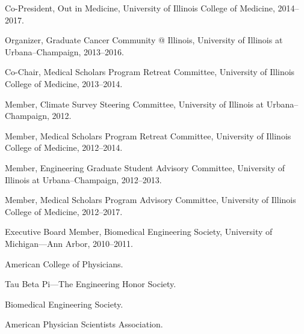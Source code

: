 \documentclass[11pt,article,oneside]{memoir}
\begin{document}
\ind Co-President, Out in Medicine, University of Illinois College of Medicine, 2014--2017.

\ind Organizer, Graduate Cancer Community @ Illinois, University of Illinois at Urbana--Champaign, 2013--2016.

\ind Co-Chair, Medical Scholars Program Retreat Committee, University of Illinois College of Medicine, 2013--2014.

\ind Member, Climate Survey Steering Committee, University of Illinois at Urbana--Champaign, 2012.

\ind Member, Medical Scholars Program Retreat Committee, University of Illinois College of Medicine, 2012--2014.

\ind Member, Engineering Graduate Student Advisory Committee, University of Illinois at Urbana--Champaign, 2012--2013.

\ind Member, Medical Scholars Program Advisory Committee, University of Illinois College of Medicine, 2012--2017.

\ind Executive Board Member, Biomedical Engineering Society, University of Michigan---Ann Arbor, 2010--2011.

\bigskip


\ind American College of Physicians.

\ind Tau Beta Pi---The Engineering Honor Society.

\ind Biomedical Engineering Society.

\ind American Physician Scientists Association.
\end{document}
